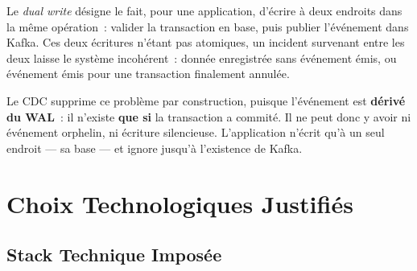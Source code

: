 \documentclass[12pt,a4paper,openany]{report}
\begin{document}
    Le \emph{dual write} d\'esigne le fait, pour une application, d'\'ecrire \`a deux endroits dans la m\^eme op\'eration~: valider la transaction en base, puis publier l'\'ev\'enement dans Kafka. Ces deux \'ecritures n'\'etant pas atomiques, un incident survenant entre les deux laisse le syst\`eme incoh\'erent~: donn\'ee enregistr\'ee sans \'ev\'enement \'emis, ou \'ev\'enement \'emis pour une transaction finalement annul\'ee.

    Le CDC supprime ce probl\`eme par construction, puisque l'\'ev\'enement est \textbf{d\'eriv\'e du WAL}~: il n'existe \textbf{que si} la transaction a commit\'e. Il ne peut donc y avoir ni \'ev\'enement orphelin, ni \'ecriture silencieuse. L'application n'\'ecrit qu'\`a un seul endroit --- sa base --- et ignore jusqu'\`a l'existence de Kafka.

    \chapter{Choix Technologiques Justifi\'es}

    \section{Stack Technique Impos\'ee}
\end{document}
